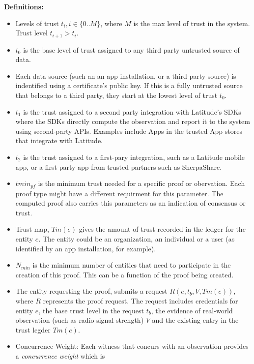 \newcommand\NF{\mathit{Nf}}
\newcommand\TM{\mathit{Tm}}
\noindent
{\bf Definitions:}
\begin{itemize}
    \item Levels of trust $t_i, i \in \{0..M\}$, where $M$ is the max level of trust in the system. Trust level $t_{i+1} >
        t_i$.
    \item $t_0$ is the base level of trust assigned to any third party untrusted source of data.

    \item Each data source (such an an app installation, or a third-party source) is indentified using a certificate's
        public key. If this is a fully untrusted source that belongs to a third party, they start at the lowest level of
        trust $t_0$.

    \item $t_1$ is the trust assigned to a second party integration with Latitude's SDKs where the SDKs directly compute the
        observation and report it to the system using second-party APIs. Examples include Apps in the trusted App stores
        that integrate with Latitude.
    \item $t_2$ is the trust assigned to a first-pary integration, such as a Latitude mobile app, or a first-party app
        from trusted partners such as SherpaShare.
    \item $tmin_{pf}$ is the minimum trust needed for a specific proof or obervation. Each proof type might have a
        different requirment for this parameter. The computed proof also carries this parameters as an indication of
        consensus or trust.
    \item Trust map, $\TM(e)$ gives the amount of trust recorded in the ledger for the entity $e$. The entity could be an
        organization, an individual or a user (as identified by an app installation, for example).
    \item $N_{min}$ is the minimum number of entities that need to participate in the creation of this proof. This can
        be a function of the proof being created.
    \item The entity requesting the proof, submits a request $R(e, t_b, V, \TM(e))$, where $R$ represents the proof
        request. The request includes credentials for entity $e$, the base trust level in the request $t_b$, the
        evidence of real-world observation (such as radio signal strength) $V$ and the existing entry in the trust
        legder $\TM(e)$.
    \item Concurrence Weight: Each witness that concurs with an observation provides a {\em concurrence weight} which is

\end{itemize}
